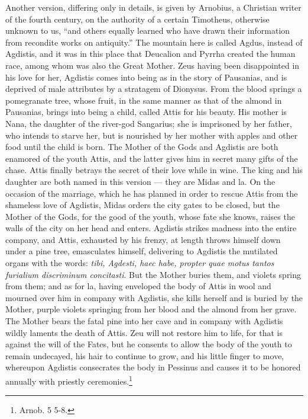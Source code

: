 \documentclass[a4paper, 11pt, oneside, polutonikogreek, english]{article}
\begin{document}
Another version, differing only in details, is given by Arnobius, a Christian writer of the fourth century, on the authority of a certain Timotheus, otherwise unknown to us, ``and others equally learned who have drawn their information from recondite works on antiquity.'' The mountain here is called Agdus, instead of Agdistis, and it was in this place that Deucalion and Pyrrha created the human race, among whom was also the Great Mother. Zeus having been disappointed in his love for her, Agdistis comes into being as in the story of Pausanias, and is deprived of male attributes by a stratagem of Dionysus. From the blood springs a pomegranate tree, whose fruit, in the same manner as that of the almond in Pausanias, brings into being a child, called Attis for his beauty. His mother is Nana, the daughter of the river-god Sangarius; she is imprisoned by her father, who intends to starve her, but is nourished by her mother with apples and other food until the child is born. The Mother of the Gods and Agdistis are both enamored of the youth Attis, and the latter gives him in secret many gifts of the chase. Attis finally betrays the secret of their love while in wine. The king and his daughter are both named in this version --- they are Midas and la. On the occasion of the marriage, which he has planned in order to rescue Attis from the shameless love of Agdistis, Midas orders the city gates to be closed, but the Mother of the Gods, for the good of the youth, whose fate she knows, raises the walls of the city on her head and enters. Agdistis strikes madness into the entire company, and Attis, exhausted by his frenzy, at length throws himself down under a pine tree, emasculates himself, delivering to Agdistis the mutilated organs with the words: \emph{tibi, Agdesti, haec habe, propter quae motus tantos furialium discriminum concitasti}. But the Mother buries them, and violets spring from them; and as for la, having enveloped the body of Attis in wool and mourned over him in company with Agdistis, she kills herself and is buried by the Mother, purple violets springing from her blood and the almond from her grave. The Mother bears the fatal pine into her cave and in company with Agdistis wildly laments the death of Attis. Zeu will not restore him to life, for that is against the will of the Fates, but he consents to allow the body of the youth to remain undecayed, his hair to continue to grow, and his little finger to move, whereupon Agdistis consecrates the body in Pessinus and causes it to be honored annually with priestly ceremonies.\footnote{Arnob. 5 5-8.}
\end{document}

